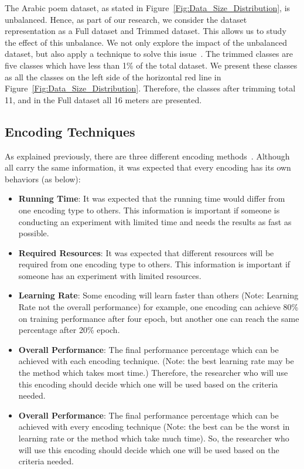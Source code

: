 The Arabic poem dataset, as stated in Figure~\ref{Fig:Data_Size_Distribution}, is unbalanced. Hence, as part of our research, we consider the dataset representation as a Full dataset and Trimmed dataset. This allows us to study the effect of this unbalance. We not only explore the impact of the unbalanced dataset, but also apply a technique to solve this issue~. The trimmed classes are five classes which have less than 1\% of the total dataset. We present these classes as all the classes on the left side of the horizontal red line in Figure~\ref{Fig:Data_Size_Distribution}. Therefore, the classes after trimming total 11, and in the Full dataset all 16 meters are presented.

\subsection{Encoding Techniques}

As explained previously, there are three different encoding methods~. Although all carry the same information, it was expected that every encoding has its own behaviors (as below):

\begin{itemize}
 \item \textbf{Running Time}: It was expected that the running time would differ from one encoding type to others. This information is important if someone is conducting an experiment with limited time and needs the results as fast as possible.
 \item \textbf{Required Resources}: It was expected that different resources will be required from one encoding type to others. This information is important if someone has an experiment with limited resources.
 
 \item \textbf{Learning Rate}: Some encoding will learn faster than others (Note: Learning Rate not the overall performance) for example, one encoding can achieve 80\% on training performance after four epoch, but another one can reach the same percentage after 20\% epoch.
 \item \textbf{Overall Performance}: The final performance percentage which can be achieved with each encoding technique. (Note: the best learning rate may be the method which takes most time.) Therefore, the researcher who will use this encoding should decide which one will be used based on the criteria needed.

 \item \textbf{Overall Performance}: The final performance percentage which can be achieved with every encoding technique (Note: the best can be the worst in learning rate or the method which take much time). So, the researcher who will use this encoding should decide which one will be used based on the criteria needed.

\end{itemize}

